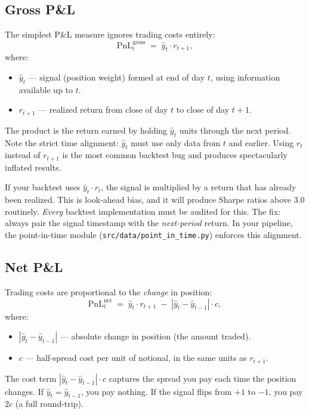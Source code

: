 \subsection{Gross P\&L}

The simplest P\&L measure ignores trading costs entirely:
\begin{equation}
\label{eq:gross-pnl}
\text{PnL}_t^{\text{gross}} \;=\; \hat{y}_t \cdot r_{t+1},
\end{equation}
where:
\begin{itemize}[nosep]
  \item $\hat{y}_t$ --- signal (position weight) formed at end of day $t$, using information available up to $t$.
  \item $r_{t+1}$ --- realized return from close of day $t$ to close of day $t+1$.
\end{itemize}
The product is the return earned by holding $\hat{y}_t$ units through the next period.  Note the strict time alignment: $\hat{y}_t$ must use only data from $t$ and earlier.  Using $r_t$ instead of $r_{t+1}$ is the most common backtest bug and produces spectacularly inflated results.

\begin{warning}
If your backtest uses $\hat{y}_t \cdot r_t$, the signal is multiplied by a return that has already been realized.  This is look-ahead bias, and it will produce Sharpe ratios above 3.0 routinely.  \emph{Every} backtest implementation must be audited for this.  The fix: always pair the signal timestamp with the \emph{next-period} return.  In your pipeline, the point-in-time module (\texttt{src/data/point\_in\_time.py}) enforces this alignment.
\end{warning}

\subsection{Net P\&L}

Trading costs are proportional to the \emph{change} in position:
\begin{equation}
\label{eq:net-pnl}
\text{PnL}_t^{\text{net}} \;=\; \hat{y}_t \cdot r_{t+1} \;-\; |\hat{y}_t - \hat{y}_{t-1}| \cdot c,
\end{equation}
where:
\begin{itemize}[nosep]
  \item $|\hat{y}_t - \hat{y}_{t-1}|$ --- absolute change in position (the amount traded).
  \item $c$ --- half-spread cost per unit of notional, in the same units as $r_{t+1}$.
\end{itemize}
The cost term $|\hat{y}_t - \hat{y}_{t-1}| \cdot c$ captures the spread you pay each time the position changes.  If $\hat{y}_t = \hat{y}_{t-1}$, you pay nothing.  If the signal flips from $+1$ to $-1$, you pay $2c$ (a full round-trip).


